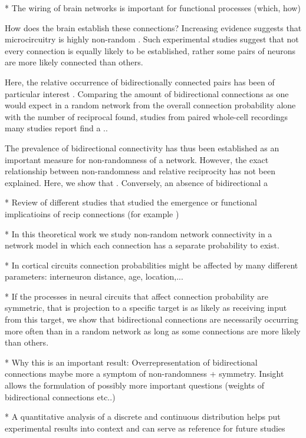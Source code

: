 
* The wiring of brain networks is important for functional processes (which, how)

How does the brain establish these connections? Increasing evidence suggests that microcircuitry is highly non-random \cite{Song2005,Perin2011}. Such experimental studies suggest that not every connection is equally likely to be established, rather some pairs of neurons are more likely connected than others.

Here, the relative occurrence of bidirectionally connected pairs has been of particular interest . Comparing the amount of bidirectional connections as one would expect in a random network from the overall connection probability alone with the number of reciprocal found, studies from paired whole-cell recordings many studies report find a .\cite{Markram1997,Song2005}.

The prevalence of bidirectional connectivity has thus been established as an important measure for non-randomness of a network. However, the exact relationship between non-randomness and relative reciprocity has not been explained. Here, we show that . Conversely, an absence of bidirectional a


* Review of different studies that studied the emergence or functional implicatioins of recip connections (for example \cite{Clopath2010})

* In this theoretical work we study non-random network connectivity in a network model in which each connection has a separate probability to exist.

* In cortical circuits connection probabilities might be affected by many different parameters: interneuron distance, age, location,...

* If the processes in neural circuits that affect connection probability are symmetric, that is projection to a specific target is as likely as receiving input from this target, we show that bidirectional connections are necessarily occurring more often than in a random network as long as some connections are more likely than others.

* Why this is an important result: Overrepresentation of bidirectional connections maybe more a symptom of non-randomness + symmetry. Insight allows the formulation of possibly more important questions (weights of bidirectional connections etc..)

* A quantitative analysis of a discrete and continuous distribution helps put experimental results into context and can serve as reference for future studies



